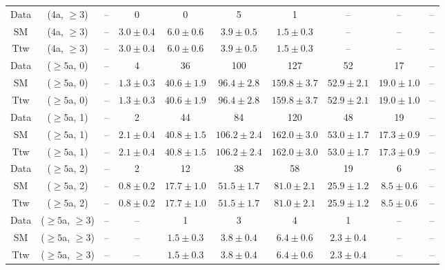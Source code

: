 \begin{table}[h!]
{\begin{tabular}{cccccccccc}
	Data & (4a, $\ge3$) & -- & 0 & 0 & 5 & 1 & -- & -- & -- \\[0.5ex] 
	SM & (4a, $\ge3$) & -- & $3.0\pm 0.4$ & $6.0\pm 0.6$ & $3.9\pm 0.5$ & $1.5\pm 0.3$ & -- & -- & -- \\[0.5ex] 
	Ttw & (4a, $\ge3$) & -- & $3.0\pm 0.4$ & $6.0\pm 0.6$ & $3.9\pm 0.5$ & $1.5\pm 0.3$ & -- & -- & -- \\[0.5ex] 
	Data & ($\ge5$a, 0) & -- & 4 & 36 & 100 & 127 & 52 & 17 & -- \\[0.5ex] 
	SM & ($\ge5$a, 0) & -- & $1.3\pm 0.3$ & $40.6\pm 1.9$ & $96.4\pm 2.8$ & $159.8\pm 3.7$ & $52.9\pm 2.1$ & $19.0\pm 1.0$ & -- \\[0.5ex] 
	Ttw & ($\ge5$a, 0) & -- & $1.3\pm 0.3$ & $40.6\pm 1.9$ & $96.4\pm 2.8$ & $159.8\pm 3.7$ & $52.9\pm 2.1$ & $19.0\pm 1.0$ & -- \\[0.5ex] 
	Data & ($\ge5$a, 1) & -- & 2 & 44 & 84 & 120 & 48 & 19 & -- \\[0.5ex] 
	SM & ($\ge5$a, 1) & -- & $2.1\pm 0.4$ & $40.8\pm 1.5$ & $106.2\pm 2.4$ & $162.0\pm 3.0$ & $53.0\pm 1.7$ & $17.3\pm 0.9$ & -- \\[0.5ex] 
	Ttw & ($\ge5$a, 1) & -- & $2.1\pm 0.4$ & $40.8\pm 1.5$ & $106.2\pm 2.4$ & $162.0\pm 3.0$ & $53.0\pm 1.7$ & $17.3\pm 0.9$ & -- \\[0.5ex] 
	Data & ($\ge5$a, 2) & -- & 2 & 12 & 38 & 58 & 19 & 6 & -- \\[0.5ex] 
	SM & ($\ge5$a, 2) & -- & $0.8\pm 0.2$ & $17.7\pm 1.0$ & $51.5\pm 1.7$ & $81.0\pm 2.1$ & $25.9\pm 1.2$ & $8.5\pm 0.6$ & -- \\[0.5ex] 
	Ttw & ($\ge5$a, 2) & -- & $0.8\pm 0.2$ & $17.7\pm 1.0$ & $51.5\pm 1.7$ & $81.0\pm 2.1$ & $25.9\pm 1.2$ & $8.5\pm 0.6$ & -- \\[0.5ex] 
	Data & ($\ge5$a, $\ge3$) & -- & -- & 1 & 3 & 4 & 1 & -- & -- \\[0.5ex] 
	SM & ($\ge5$a, $\ge3$) & -- & -- & $1.5\pm 0.3$ & $3.8\pm 0.4$ & $6.4\pm 0.6$ & $2.3\pm 0.4$ & -- & -- \\[0.5ex] 
	Ttw & ($\ge5$a, $\ge3$) & -- & -- & $1.5\pm 0.3$ & $3.8\pm 0.4$ & $6.4\pm 0.6$ & $2.3\pm 0.4$ & -- & -- \\[0.5ex] 
	\hline
	\hline
\end{tabular}}
\end{table}

